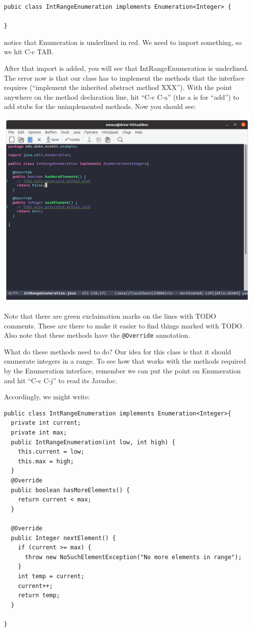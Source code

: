 \documentclass[12pt]{article}
\begin{document}
\begin{verbatim}
pubic class IntRangeEnumeration implements Enumeration<Integer> {

}
\end{verbatim}

notice that Enumeration is underlined in red.  We need to import something,
so we hit C-c TAB.

After that import is added, you will see that IntRangeEnumeration is
underlined. The error now is that our class has to implement the
methods that the interface requires (``implement the inherited
abstract method XXX'').  With the point anywhere on the method
declaration line, hit ``C-c C-a'' (the a is for ``add'') to add stubs
for the unimplemented methods. Now you should see:

\begin{center}
  \includegraphics[width=5.5in]{emacs-add-method.png}
\end{center}
Note that there are green exclaimation marks on the lines with TODO comments.
These are there to make it easier to find things marked with TODO.
Also note that these methods have the \verb+@Override+ annotation.

What do these methods need to do?  Our idea for this class is that it
should enumerate integers in a range.  To see how that works with the
methods required by the Enumeration interface, remember we can put the
point on Enumeration and hit ``C-c C-j'' to read its Javadoc.

Accordingly, we might write:

\begin{verbatim}
public class IntRangeEnumeration implements Enumeration<Integer>{
  private int current;
  private int max;
  public IntRangeEnumeration(int low, int high) {
    this.current = low;
    this.max = high;
  }
  @Override
  public boolean hasMoreElements() {
    return current < max;
  }

  @Override
  public Integer nextElement() {
    if (current >= max) {
      throw new NoSuchElementException("No more elements in range");
    }
    int temp = current;
    current++;
    return temp;
  }

}
\end{verbatim}
\end{document}
